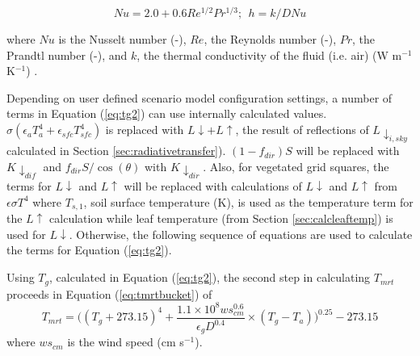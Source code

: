 \documentclass[final,3p,times,authoryear]{elsarticle}
\begin{document}
\begin{equation}\label{eq:h}
Nu = 2.0 + 0.6Re^{1/2}Pr^{1/3};  ~~h = k / D Nu
\end{equation}

where $Nu$ is the Nusselt number (-),
$Re$, the Reynolds number (-),
$Pr$, the Prandtl number (-), and 
$k$, the thermal conductivity of the fluid (i.e. air) (W m$^{-1}$K$^{-1}$) \citep{Liljegren2008}.



Depending on user defined scenario model configuration settings, a number of terms in Equation (\ref{eq:tg2}) can use internally calculated values. $\sigma(\epsilon_{a} T_{a}^{4} + \epsilon_{sfc} T_{sfc}^{4} )$ is replaced with $L\downarrow + L\uparrow$, the result of reflections of $L \downarrow_{i,sky}$ calculated in Section \ref{sec:radiativetransfer}). $(1-f_{dir})S$ will be replaced with $K \downarrow_{dif}$ and $f_{dir}S/ \cos(\theta)$ with $K \downarrow_{dir}$. Also, for vegetated grid squares, the terms for $L\downarrow$ and $L\uparrow$ will be replaced with calculations of $L\downarrow$ and $L\uparrow$ from $\epsilon \sigma T^{4}$ where $T_{s,1}$, soil surface temperature (K), is used as the temperature term for the $L\uparrow$ calculation while leaf temperature (from Section \ref{sec:calcleaftemp}) is used for $L\downarrow$. Otherwise, the following sequence of equations are used to calculate the terms for Equation (\ref{eq:tg2}).



Using $T_{g}$, calculated in Equation (\ref{eq:tg2}), the second step in calculating $T_{mrt}$ proceeds in Equation (\ref{eq:tmrtbucket}) of \cite{Kantor2011}
\begin{equation}\label{eq:tmrtbucket}
  T_{mrt} = 
  \bigg(
   (T_{g}+273.15)^{4} + 
    \frac{1.1 \times 10^{8}  ws_{cm}^{0.6}}{\epsilon_{g}  D^{0.4}}
    \times 
     (T_{g}-T_{a})
    \bigg)^{0.25} - 273.15
\end{equation}
 where $ws_{cm}$ is the wind speed (cm s$^{-1}$).
\end{document}
